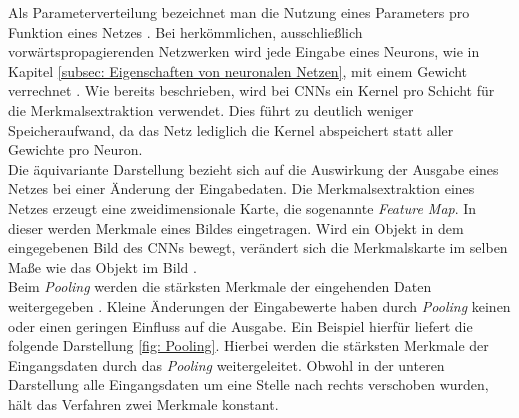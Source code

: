 		Als Parameterverteilung bezeichnet man die Nutzung eines Parameters pro Funktion eines Netzes \cite{deeplearning}. Bei herkömmlichen, ausschließlich vorwärtspropagierenden Netzwerken wird jede Eingabe eines Neurons, wie in Kapitel \ref{subsec: Eigenschaften von neuronalen Netzen}, mit einem Gewicht verrechnet  \cite{deeplearning}. Wie bereits beschrieben, wird bei CNNs ein Kernel pro Schicht für die Merkmalsextraktion verwendet. Dies führt zu deutlich weniger Speicheraufwand, da das Netz lediglich die Kernel abspeichert statt aller Gewichte pro Neuron.\\
		
		Die äquivariante Darstellung bezieht sich auf die Auswirkung der Ausgabe eines Netzes bei einer Änderung der Eingabedaten. Die Merkmalsextraktion eines Netzes erzeugt eine zweidimensionale Karte, die sogenannte \textit{Feature Map}. In dieser werden Merkmale eines Bildes eingetragen. Wird ein Objekt in dem eingegebenen Bild des CNNs bewegt, verändert sich die Merkmalskarte im selben Maße wie das Objekt im Bild \cite{deeplearning}.\\		
		
		Beim \textit{Pooling} werden die stärksten Merkmale der eingehenden Daten weitergegeben \cite{deeplearning}. Kleine Änderungen der Eingabewerte haben durch \textit{Pooling} keinen oder einen geringen Einfluss auf die Ausgabe. Ein Beispiel hierfür liefert die folgende Darstellung \ref{fig: Pooling}. Hierbei werden die stärksten Merkmale der Eingangsdaten durch das \textit{Pooling} weitergeleitet. Obwohl in der unteren Darstellung alle Eingangsdaten um eine Stelle nach rechts verschoben wurden, hält das Verfahren zwei Merkmale konstant.\\
		
